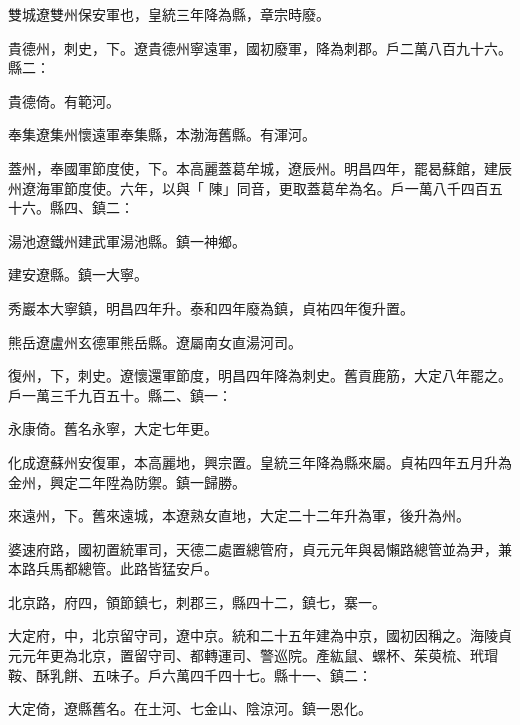 \begin{pinyinscope}
 雙城遼雙州保安軍也，皇統三年降為縣，章宗時廢。



 貴德州，刺史，下。遼貴德州寧遠軍，國初廢軍，降為刺郡。戶二萬八百九十六。縣二：



 貴德倚。有範河。



 奉集遼集州懷遠軍奉集縣，本渤海舊縣。有渾河。



 蓋州，奉國軍節度使，下。本高麗蓋葛牟城，遼辰州。明昌四年，罷曷蘇館，建辰州遼海軍節度使。六年，以與「
 陳」同音，更取蓋葛牟為名。戶一萬八千四百五十六。縣四、鎮二：



 湯池遼鐵州建武軍湯池縣。鎮一神鄉。



 建安遼縣。鎮一大寧。



 秀巖本大寧鎮，明昌四年升。泰和四年廢為鎮，貞祐四年復升置。



 熊岳遼盧州玄德軍熊岳縣。遼屬南女直湯河司。



 復州，下，刺史。遼懷還軍節度，明昌四年降為刺史。舊貢鹿筋，大定八年罷之。戶一萬三千九百五十。縣二、鎮一：



 永康倚。舊名永寧，大定七年更。



 化成遼蘇州安復軍，本高麗地，興宗置。皇統三年降為縣來屬。貞祐四年五月升為金州，興定二年陞為防禦。鎮一歸勝。



 來遠州，下。舊來遠城，本遼熟女直地，大定二十二年升為軍，後升為州。



 婆速府路，國初置統軍司，天德二處置總管府，貞元元年與曷懶路總管並為尹，兼本路兵馬都總管。此路皆猛安戶。



 北京路，府四，領節鎮七，刺郡三，縣四十二，鎮七，寨一。



 大定府，中，北京留守司，遼中京。統和二十五年建為中京，國初因稱之。海陵貞元元年更為北京，置留守司、都轉運司、警巡院。產紘鼠、螺杯、茱萸梳、玳瑁鞍、酥乳餅、五味子。戶六萬四千四十七。縣十一、鎮二：



 大定倚，遼縣舊名。在土河、七金山、陰涼河。鎮一恩化。




\end{pinyinscope}
